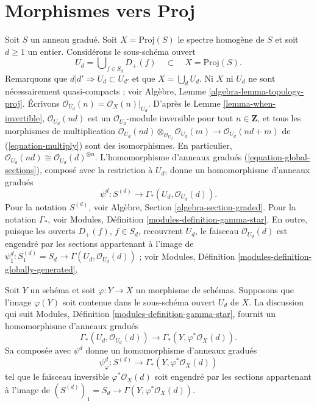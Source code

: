 \section{Morphismes vers Proj}
\label{section-morphisms-proj}

\noindent
Soit $S$ un anneau gradué. Soit $X = \text{Proj}(S)$ le spectre homogène de
$S$ et soit $d \geq 1$ un entier. Considérons le sous-schéma ouvert
\begin{equation}
\label{equation-Ud}
U_d = \bigcup\nolimits_{f  \in S_d} D_{+}(f)
\quad\subset\quad
X = \text{Proj}(S).
\end{equation}
Remarquons que $d | d' \Rightarrow U_d \subset U_{d'}$ et que
$X = \bigcup_d U_d$. Ni $X$ ni $U_d$ ne sont nécessairement quasi-compacts ;
voir Algèbre, Lemme \ref{algebra-lemma-topology-proj}. Écrivons
$\mathcal{O}_{U_d}(n) = \mathcal{O}_X(n)|_{U_d}$. D'après le
Lemme \ref{lemma-when-invertible}, $\mathcal{O}_{U_d}(nd)$ est un
$\mathcal{O}_{U_d}$-module inversible pour tout $n \in \mathbf{Z}$, et tous
les morphismes de multiplication
$\mathcal{O}_{U_d}(nd) \otimes_{\mathcal{O}_{U_d}} \mathcal{O}_{U_d}(m)
\to \mathcal{O}_{U_d}(nd + m)$ de (\ref{equation-multiply}) sont des
isomorphismes. En particulier,
$\mathcal{O}_{U_d}(nd) \cong \mathcal{O}_{U_d}(d)^{\otimes n}$.
L'homomorphisme d'anneaux gradués (\ref{equation-global-sections}), composé
avec la restriction à $U_d$, donne un homomorphisme d'anneaux gradués
\begin{equation}
\label{equation-psi-d}
\psi^d : S^{(d)} \longrightarrow \Gamma_*(U_d, \mathcal{O}_{U_d}(d)).
\end{equation}
Pour la notation $S^{(d)}$, voir Algèbre,
Section \ref{algebra-section-graded}. Pour la notation $\Gamma_*$, voir
Modules, Définition \ref{modules-definition-gamma-star}. En outre, puisque les
ouverts $D_{+}(f)$, $f \in S_d$, recouvrent $U_d$, le faisceau
$\mathcal{O}_{U_d}(d)$ est engendré par les sections appartenant à l'image de
$\psi^d_1 : S^{(d)}_1 = S_d \to \Gamma(U_d, \mathcal{O}_{U_d}(d))$ ; voir
Modules, Définition \ref{modules-definition-globally-generated}.

\medskip\noindent
Soit $Y$ un schéma et soit $\varphi : Y \to X$ un morphisme de schémas.
Supposons que l'image $\varphi(Y)$ soit contenue dans le sous-schéma ouvert
$U_d$ de $X$. La discussion qui suit Modules,
Définition \ref{modules-definition-gamma-star}, fournit un homomorphisme
d'anneaux gradués
$$
\Gamma_*(U_d, \mathcal{O}_{U_d}(d))
\longrightarrow
\Gamma_*(Y, \varphi^*\mathcal{O}_X(d)).
$$
Sa composée avec $\psi^d$ donne un homomorphisme d'anneaux gradués
\begin{equation}
\label{equation-psi-phi-d}
\psi_\varphi^d :
S^{(d)}
\longrightarrow
\Gamma_*(Y, \varphi^*\mathcal{O}_X(d))
\end{equation}
tel que le faisceau inversible $\varphi^*\mathcal{O}_X(d)$ soit engendré par
les sections appartenant à l'image de
$(S^{(d)})_1 = S_d \to \Gamma(Y, \varphi^*\mathcal{O}_X(d))$.

